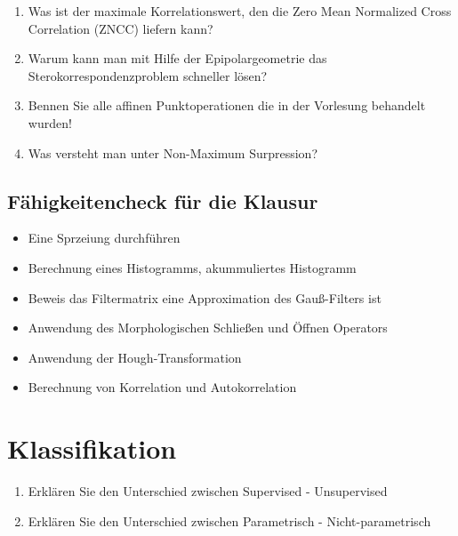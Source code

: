 \begin{enumerate}
	\item Was ist der maximale Korrelationswert, den die Zero Mean Normalized Cross Correlation (ZNCC) liefern kann?
	\item Warum kann man mit Hilfe der Epipolargeometrie das Sterokorrespondenzproblem schneller lösen?
	\item Bennen Sie alle affinen Punktoperationen die in der Vorlesung behandelt wurden!
	\item Was versteht man unter Non-Maximum Surpression?
\end{enumerate}

\subsection{Fähigkeitencheck für die Klausur}
\begin{itemize}
	\item Eine Sprzeiung durchführen %
	\item Berechnung eines Histogramms, akummuliertes Histogramm %
	\item Beweis das Filtermatrix eine Approximation des Gauß-Filters ist %
	\item Anwendung des Morphologischen Schließen und Öffnen Operators %
	\item Anwendung der Hough-Transformation %
	\item Berechnung von Korrelation und Autokorrelation %
\end{itemize}
\section{Klassifikation}
\begin{enumerate}
	\item Erklären Sie den Unterschied zwischen Supervised - Unsupervised
	\item Erklären Sie den Unterschied zwischen Parametrisch - Nicht-parametrisch
\end{enumerate}
